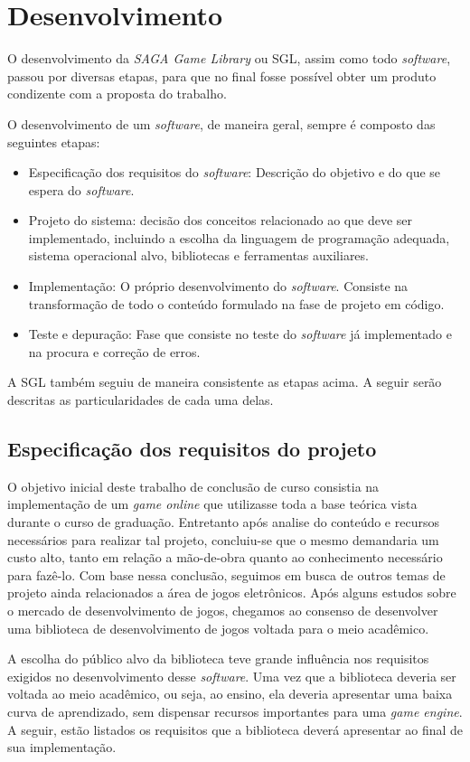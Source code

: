 \chapter{Desenvolvimento}
\label{cap:desenvolvimento}
%
%
O desenvolvimento da \textit{SAGA Game Library} ou SGL, assim como todo \textit{software}, passou por diversas etapas, para que no final fosse possível obter um produto condizente com a proposta do trabalho.
\par 
O desenvolvimento de um \textit{software}, de maneira geral, sempre é composto das seguintes etapas:
%
\begin{itemize}
\item Especificação dos requisitos do \textit{software}: Descrição do objetivo e do que se espera do \textit{software}.
\item Projeto do sistema: decisão dos conceitos relacionado ao que deve ser implementado, incluindo a escolha da linguagem de programação adequada, sistema operacional alvo, bibliotecas e ferramentas auxiliares.
\item Implementação: O próprio desenvolvimento do \textit{software}. Consiste na transformação de todo o conteúdo formulado na fase de projeto em código.
\item Teste e depuração: Fase que consiste no teste do \textit{software} já implementado e na procura e correção de erros.
\end{itemize}
%
\par 
A SGL também seguiu de maneira consistente as etapas acima. A seguir serão descritas as particularidades de cada uma delas.
%
%
%
%
\section{Especificação dos requisitos do projeto}
%
O objetivo inicial deste trabalho de conclusão de curso consistia na implementação de um \textit{game online} que utilizasse toda a base teórica vista durante o curso de graduação. Entretanto após analise do conteúdo e recursos necessários para realizar tal projeto, concluiu-se que o mesmo demandaria um custo alto, tanto em relação a mão-de-obra quanto ao conhecimento necessário para fazê-lo. Com base nessa conclusão, seguimos em busca de outros temas de projeto ainda relacionados a área de jogos eletrônicos. Após alguns estudos sobre o mercado de desenvolvimento de jogos, chegamos ao consenso de desenvolver uma biblioteca de desenvolvimento de jogos voltada para o meio acadêmico.
\par 
A escolha do público alvo da biblioteca teve grande influência nos requisitos exigidos no desenvolvimento desse \textit{software}. Uma vez que a biblioteca deveria ser voltada ao meio acadêmico, ou seja, ao ensino, ela deveria apresentar uma baixa curva de aprendizado, sem dispensar recursos importantes para uma \textit{game engine}. A seguir, estão listados os requisitos que a biblioteca deverá apresentar ao final de sua implementação.
%
